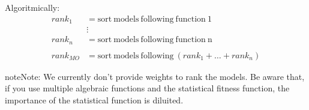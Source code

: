\documentclass[letterpaper,10pt,english]{sphinxmanual}
\begin{document}
Algoritmically:
\begin{equation*}
\begin{split}rank_1 &= \mathrm{sort\ models\ following\ function\ 1} \\
&\mathrel{\vdots} \\
rank_n &= \mathrm{sort\ models\ following\ function\ n} \\
\\
rank_{MO} &= \mathrm{sort\ models\ following\ } (rank_1 + \ldots + rank_n)\end{split}
\end{equation*}
\begin{sphinxadmonition}{note}{Note:}
We currently don’t provide weights to rank the models. Be aware that, if you
use multiple algebraic functions and the statistical fitness function, the
importance of the statistical function is diluited.
\end{sphinxadmonition}
\end{document}
